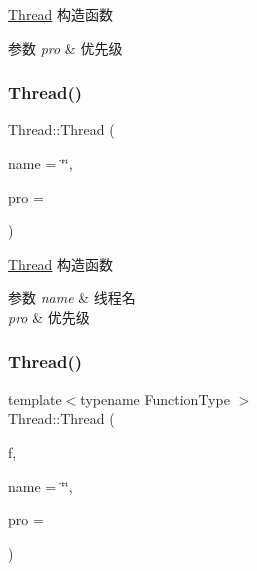 \hyperlink{classThread}{Thread} 构造函数 


\begin{DoxyParams}{参数}
{\em pro} & 优先级 \\
\hline
\end{DoxyParams}
\mbox{\label{classThread_a038819a1ef7bb4e50ae580d477f1a3b0}} 
\subsubsection{\texorpdfstring{Thread()}{Thread()}\hspace{0.1cm}{\footnotesize\ttfamily [2/3]}}
{\footnotesize\ttfamily Thread\+::\+Thread (\begin{DoxyParamCaption}\item[{const std\+::string \&}]{name = {\ttfamily \char`\"{}\char`\"{}},  }\item[{int}]{pro = {} }\end{DoxyParamCaption})\hspace{0.3cm}{\ttfamily [inline]}}



\hyperlink{classThread}{Thread} 构造函数 


\begin{DoxyParams}{参数}
{\em name} & 线程名 \\
\hline
{\em pro} & 优先级 \\
\hline
\end{DoxyParams}
\mbox{\label{classThread_a61efca5f0beb62628c515fb7cdef7e08}} 
\subsubsection{\texorpdfstring{Thread()}{Thread()}\hspace{0.1cm}{\footnotesize\ttfamily [3/3]}}
{\footnotesize\ttfamily template$<$typename Function\+Type $>$ \\
Thread\+::\+Thread (\begin{DoxyParamCaption}\item[{Function\+Type}]{f,  }\item[{const std\+::string \&}]{name = {\ttfamily \char`\"{}\char`\"{}},  }\item[{int}]{pro = {} }\end{DoxyParamCaption})\hspace{0.3cm}{\ttfamily [inline]}}



